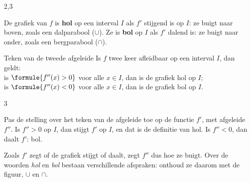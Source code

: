 \begin{alleenvoor}{2,3}

\begin{theorie}
De grafiek van $f$ is \textbf{\textcolor{accent}{hol}} op een interval $I$ als $f'$ stijgend is op $I$: ze buigt naar boven, zoals een dalparabool ($\cup$). Ze is \textbf{\textcolor{accent}{bol}} op $I$ als $f'$ dalend is: ze buigt naar onder, zoals een bergparabool ($\cap$).

\begin{stelling}{Teken van de tweede afgeleide}
Is $f$ twee keer afleidbaar op een interval $I$, dan geldt: \\[1mm]
\qquad is $\formule{f''(x) > 0}$ voor alle $x \in I$, dan is de grafiek hol op $I$; \\
\qquad is $\formule{f''(x) < 0}$ voor alle $x \in I$, dan is de grafiek bol op $I$.
\end{stelling}
\begin{alleenvoor}{3}
\begin{bewijs}
Pas de stelling over het teken van de afgeleide toe op de functie $f'$, met afgeleide $f''$. Is $f'' > 0$ op $I$, dan stijgt $f'$ op $I$, en dat is de definitie van hol. Is $f'' < 0$, dan daalt $f'$: bol.
\end{bewijs}
\end{alleenvoor}
\end{theorie}

Zoals $f'$ zegt of de grafiek stijgt of daalt, zegt $f''$ dus hoe ze buigt. Over de woorden \textit{hol} en \textit{bol} bestaan verschillende afspraken: onthoud ze daarom met de figuur, $\cup$ en $\cap$.


\end{alleenvoor}
